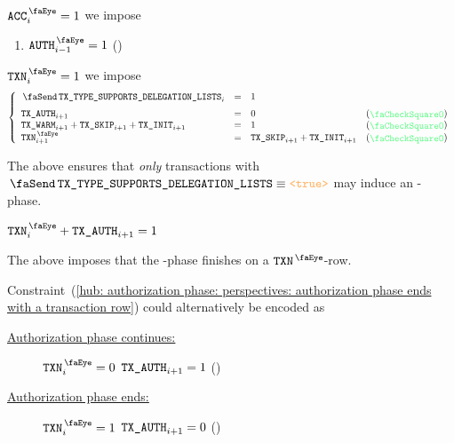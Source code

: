 \begin{description}
\begin{description}
				\If $\peekAccount _{i} = 1$ \Then we impose
				\begin{enumerate}
					\item $\peekAuthorization _{i - 1} = 1$ (\sanityCheck)
				\end{enumerate}
			\item[\underline{From the (only and final) $\peekTransaction$-row:}]
				\If $\peekTransaction _{i} = 1$ \Then we impose
				\[
					\left\{ \begin{array}{lclr}
						\txTypeSupportsDelegationLists _{i}                    & = & 1 \vspace{2mm}                      \\
						\txAuth _{i + 1}                                       & = & 0                                    & (\sanityCheck) \\
						\txWarm _{i + 1} + \txSkip _{i + 1} + \txInit _{i + 1} & = & 1                                    & (\sanityCheck) \\
						\peekTransaction _{i + 1}                              & = & \txSkip _{i + 1} + \txInit _{i + 1}  & (\sanityCheck) \\
					\end{array} \right.
				\]

				\saNote{}\label{hub: authorization phase: perspectives: the transation type must support delegation lists}
				The above ensures that \emph{only} transactions with
				$\txTypeSupportsDelegationLists \equiv \true$ may induce an \txAuth{}-phase.
		\end{description}
	\item[\underline{\underline{Authorization phases finish on a $\peekTransaction$-row:}}] 
		\label{hub: authorization phase: perspectives: authorization phase ends with a transaction row}
		$\peekTransaction _{i} + \txAuth _{i + 1} = 1$

		\saNote{}
		The above imposes that the \txAuth{}-phase finishes on a $\peekTransaction$-row.
\end{description}
Constraint~(\ref{hub: authorization phase: perspectives: authorization phase ends with a transaction row})
could alternatively be encoded as
\begin{description}
	\item[\underline{\underline{Authorization phase continues:}}]
		\If   $\peekTransaction _{i} = 0$
		\Then $\texttt{TX}\texttt{\_AUTH} _{i + 1} = 1$
		(\sanityCheck)
	\item[\underline{\underline{Authorization phase ends:}}]
		\If   $\peekTransaction _{i} = 1$
		\Then $\texttt{TX}\texttt{\_AUTH} _{i + 1} = 0$
		(\sanityCheck)
\end{description}
